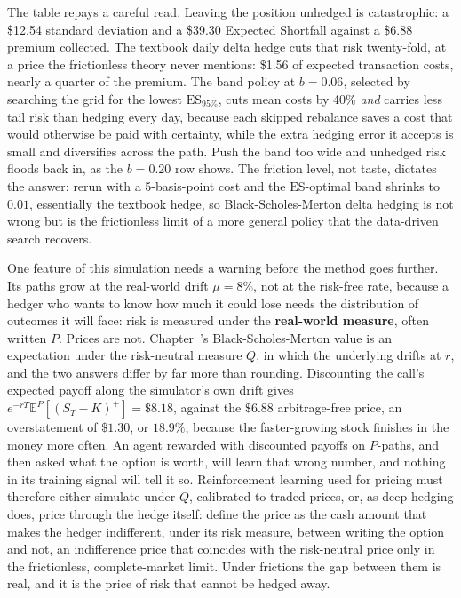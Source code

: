 \documentclass[../ai_in_finance]{subfiles}
\begin{document}
The table repays a careful read. Leaving the position unhedged is catastrophic: a \$12.54 standard deviation and a \$39.30 Expected Shortfall against a \$6.88 premium collected. The textbook daily delta hedge cuts that risk twenty-fold, at a price the frictionless theory never mentions: \$1.56 of expected transaction costs, nearly a quarter of the premium. The band policy at $b=0.06$, selected by searching the grid for the lowest $\mathrm{ES}_{95\%}$, cuts mean costs by 40\% \emph{and} carries less tail risk than hedging every day, because each skipped rebalance saves a cost that would otherwise be paid with certainty, while the extra hedging error it accepts is small and diversifies across the path. Push the band too wide and unhedged risk floods back in, as the $b=0.20$ row shows. The friction level, not taste, dictates the answer: rerun with a 5-basis-point cost and the $\mathrm{ES}$-optimal band shrinks to $0.01$, essentially the textbook hedge, so Black-Scholes-Merton delta hedging is not wrong but is the frictionless limit of a more general policy that the data-driven search recovers.

One feature of this simulation needs a warning before the method goes further. Its paths grow at the real-world drift $\mu=8\%$, not at the risk-free rate, because a hedger who wants to know how much it could lose needs the distribution of outcomes it will face: risk is measured under the \textbf{real-world measure}, often written $P$. Prices are not. Chapter~'s Black-Scholes-Merton value is an expectation under the risk-neutral measure $Q$, in which the underlying drifts at $r$, and the two answers differ by far more than rounding. Discounting the call's expected payoff along the simulator's own drift gives $e^{-rT}\mathbb{E}^{P}[(S_T-K)^+] = \$8.18$, against the $\$6.88$ arbitrage-free price, an overstatement of $\$1.30$, or $18.9\%$, because the faster-growing stock finishes in the money more often. An agent rewarded with discounted payoffs on $P$-paths, and then asked what the option is worth, will learn that wrong number, and nothing in its training signal will tell it so. Reinforcement learning used for pricing must therefore either simulate under $Q$, calibrated to traded prices, or, as deep hedging does, price through the hedge itself: \textcite{buehler2019deep} define the price as the cash amount that makes the hedger indifferent, under its risk measure, between writing the option and not, an indifference price that coincides with the risk-neutral price only in the frictionless, complete-market limit. Under frictions the gap between them is real, and it is the price of risk that cannot be hedged away.
\end{document}
